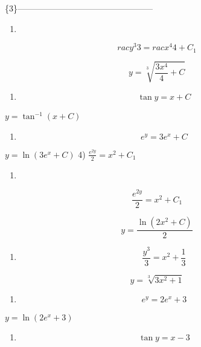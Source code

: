 \documentclass[
]{article}
\providecommand{\tightlist}{%
  \setlength{\itemsep}{0pt}\setlength{\parskip}{0pt}}
\begin{document}
\{3\}------------------------------------------------

\begin{enumerate}
\def\labelenumi{\arabic{enumi})}
\tightlist
\item
\end{enumerate}

\[rac{y^3}{3} = rac{x^4}{4} + C_1\]

\[y = \sqrt[3]{\frac{3x^4}{4} + C}\]

\begin{enumerate}
\def\labelenumi{\arabic{enumi})}
\setcounter{enumi}{1}
\tightlist
\item
  \[\tan y = x + C\]
\end{enumerate}

\(y = \tan^{-1} (x + C)\)

\begin{enumerate}
\def\labelenumi{\arabic{enumi})}
\setcounter{enumi}{2}
\tightlist
\item
  \[e^y = 3e^x + C\]
\end{enumerate}

\(y = \ln (3e^x + C)\) 4) \(\frac{e^{2y}}{2} = x^2 + C_1\)

\begin{enumerate}
\def\labelenumi{\arabic{enumi})}
\setcounter{enumi}{3}
\tightlist
\item
\end{enumerate}

\[\frac{e^{2y}}{2} = x^2 + C_1\]

\[y = \frac{\ln(2x^2 + C)}{2}\]

\begin{enumerate}
\def\labelenumi{\arabic{enumi})}
\setcounter{enumi}{4}
\tightlist
\item
  \[\frac{y^3}{3} = x^2 + \frac{1}{3}\]
\end{enumerate}

\[y = \sqrt[3]{3x^2 + 1}\]

\begin{enumerate}
\def\labelenumi{\arabic{enumi})}
\setcounter{enumi}{5}
\tightlist
\item
  \[e^y = 2e^x + 3\]
\end{enumerate}

\(y = \ln (2e^x + 3)\)

\begin{enumerate}
\def\labelenumi{\arabic{enumi})}
\setcounter{enumi}{6}
\tightlist
\item
  \[\tan y = x - 3\]
\end{enumerate}
\end{document}
